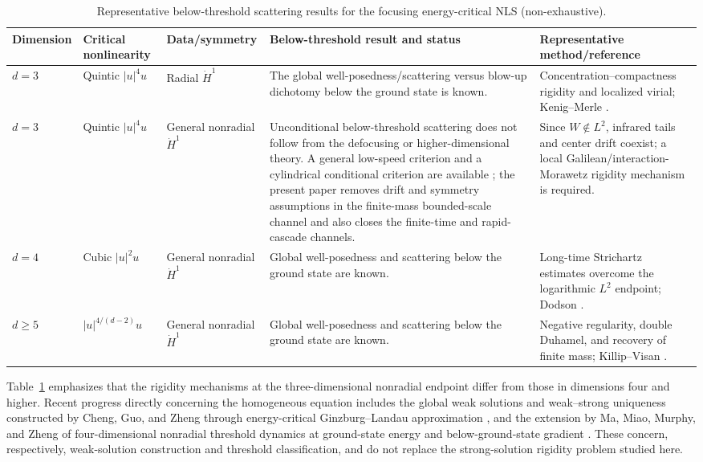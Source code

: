 \documentclass{interact}
\numberwithin{equation}{section}
\theoremstyle{plain}
\theoremstyle{definition}
\theoremstyle{remark}
\begin{document}
\begin{table}[htbp]
\centering
\caption{Representative below-threshold scattering results for the focusing energy-critical NLS (non-exhaustive).}
\label{tab:focusing-status}
\scriptsize
\setlength{\tabcolsep}{2.2pt}
\renewcommand{\arraystretch}{1.15}
\begin{tabularx}{\textwidth}{>{\Centering\arraybackslash}p{1.30cm}>{\RaggedRight\arraybackslash}p{2.15cm}>{\RaggedRight\arraybackslash}p{1.75cm}>{\RaggedRight\arraybackslash}X>{\RaggedRight\arraybackslash}p{2.35cm}}
\toprule
Dimension & Critical nonlinearity & Data/symmetry & Below-threshold result and status & Representative method/reference \\
\midrule
$d=3$
& Quintic $|u|^4u$
& Radial $\dot H^1$
& The global well-posedness/scattering versus blow-up dichotomy below the ground state is known.
& Concentration--compactness rigidity and localized virial; Kenig--Merle \cite{KenigMerle2006}.\\
$d=3$
& Quintic $|u|^4u$
& General nonradial $\dot H^1$
& Unconditional below-threshold scattering does not follow from the defocusing or higher-dimensional theory. A general low-speed criterion and a cylindrical conditional criterion are available \cite{ChungHan2026,ChungHanCylindrical2026}; the present paper removes drift and symmetry assumptions in the finite-mass bounded-scale channel and also closes the finite-time and rapid-cascade channels.
& Since $W\notin L^2$, infrared tails and center drift coexist; a local Galilean/interaction-Morawetz rigidity mechanism is required.\\
$d=4$
& Cubic $|u|^2u$
& General nonradial $\dot H^1$
& Global well-posedness and scattering below the ground state are known.
& Long-time Strichartz estimates overcome the logarithmic $L^2$ endpoint; Dodson \cite{Dodson2019}.\\
$d\ge5$
& $|u|^{4/(d-2)}u$
& General nonradial $\dot H^1$
& Global well-posedness and scattering below the ground state are known.
& Negative regularity, double Duhamel, and recovery of finite mass; Killip--Visan \cite{KillipVisan2010}.\\
\bottomrule
\end{tabularx}
\end{table}

Table~\ref{tab:focusing-status} emphasizes that the rigidity mechanisms at the three-dimensional nonradial endpoint differ from those in dimensions four and higher. Recent progress directly concerning the homogeneous equation includes the global weak solutions and weak--strong uniqueness constructed by Cheng, Guo, and Zheng through energy-critical Ginzburg--Landau approximation \cite{ChengGuoZheng2023}, and the extension by Ma, Miao, Murphy, and Zheng of four-dimensional nonradial threshold dynamics at ground-state energy and below-ground-state gradient \cite{MaMiaoMurphyZheng2025}. These concern, respectively, weak-solution construction and threshold classification, and do not replace the strong-solution rigidity problem studied here.
\end{document}
